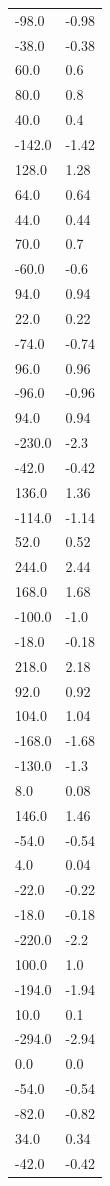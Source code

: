 \begin{longtable}{ll}
-98.0 & -0.98 \\
-38.0 & -0.38 \\
60.0 & 0.6 \\
80.0 & 0.8 \\
40.0 & 0.4 \\
-142.0 & -1.42 \\
128.0 & 1.28 \\
64.0 & 0.64 \\
44.0 & 0.44 \\
70.0 & 0.7 \\
-60.0 & -0.6 \\
94.0 & 0.94 \\
22.0 & 0.22 \\
-74.0 & -0.74 \\
96.0 & 0.96 \\
-96.0 & -0.96 \\
94.0 & 0.94 \\
-230.0 & -2.3 \\
-42.0 & -0.42 \\
136.0 & 1.36 \\
-114.0 & -1.14 \\
52.0 & 0.52 \\
244.0 & 2.44 \\
168.0 & 1.68 \\
-100.0 & -1.0 \\
-18.0 & -0.18 \\
218.0 & 2.18 \\
92.0 & 0.92 \\
104.0 & 1.04 \\
-168.0 & -1.68 \\
-130.0 & -1.3 \\
8.0 & 0.08 \\
146.0 & 1.46 \\
-54.0 & -0.54 \\
4.0 & 0.04 \\
-22.0 & -0.22 \\
-18.0 & -0.18 \\
-220.0 & -2.2 \\
100.0 & 1.0 \\
-194.0 & -1.94 \\
10.0 & 0.1 \\
-294.0 & -2.94 \\
0.0 & 0.0 \\
-54.0 & -0.54 \\
-82.0 & -0.82 \\
34.0 & 0.34 \\
-42.0 & -0.42 \\

\end{longtable}

